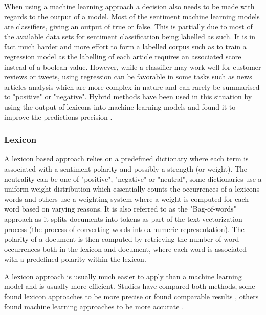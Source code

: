 When using a machine learning approach a decision also needs to be made with regards to the output of a model. Most of the sentiment machine learning models are classifiers, giving an output of true or false. This is partially due to most of the available data sets for sentiment classification being labelled as such. It is in fact much harder and more effort to form a labelled corpus such as to train a regression model as the labelling of each article requires an associated score instead of a boolean value. However, while a classifier may work well for customer reviews or tweets, using regression can be favorable in some tasks such as news articles analysis which are more complex in nature and can rarely be summarised to "positive" or "negative". Hybrid methods have been used in this situation by using the output of lexicons into machine learning models and found it to improve the predictions precision \citep{kolchyna2015twitter}.

\subsubsection{Lexicon}

A lexicon based approach relies on a predefined dictionary where each term is associated with a sentiment polarity and possibly a strength (or weight). The neutrality can be one of "positive", "negative" or "neutral", some dictionaries use a uniform weight distribution which essentially counts the occurrences of a lexicons words and others use a weighting system where a weight is computed for each word based on varying reasons. It is also referred to as the "Bag-of-words" approach as it splits documents into tokens as part of the text vectorization process (the process of converting words into a numeric representation). The polarity of a document is then computed by retrieving the number of word occurrences both in the lexicon and document, where each word is associated with a predefined polarity within the lexicon.

A lexicon approach is usually much easier to apply than a machine learning model and is usually more efficient. Studies have compared both methods, some found lexicon approaches to be more precise or found comparable results \citep{dhaoui2017social,mukhtar2018lexicon}, others found machine learning approaches to be more accurate \citep{kolchyna2015twitter,nasim2017sentiment}.

